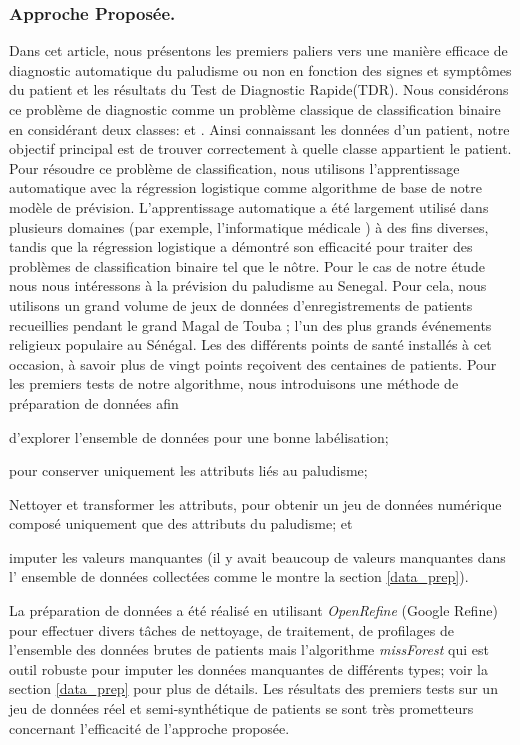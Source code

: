 \subsubsection{Approche Proposée.}
Dans cet article, nous présentons les premiers paliers vers une manière efficace de diagnostic automatique du paludisme ou non en fonction des signes et symptômes du patient et les résultats du Test de Diagnostic Rapide(TDR). Nous considérons ce problème de diagnostic comme un problème classique de classification binaire en considérant deux classes:  et
. Ainsi connaissant les données d'un patient, notre objectif principal est de trouver correctement à quelle classe appartient le patient. Pour résoudre ce problème de classification, nous utilisons l’apprentissage automatique avec la  régression logistique comme algorithme de base de notre modèle  de prévision. L'apprentissage automatique a été largement utilisé dans plusieurs domaines (par exemple, l'informatique médicale \cite{Du13}) à des fins diverses, tandis que la régression logistique a démontré son efficacité pour traiter des problèmes de classification binaire tel que le nôtre. Pour le cas de notre étude nous nous intéressons à la prévision du paludisme au Senegal. Pour cela, nous utilisons un grand volume de jeux de données d’enregistrements de patients recueillies pendant le grand Magal de Touba ; l’un des plus grands événements religieux populaire au Sénégal.  Les des différents points de santé installés à cet occasion, à savoir plus de vingt points  reçoivent des centaines de patients. Pour les premiers tests de notre algorithme, nous introduisons une méthode  de préparation de données afin 
\begin{inparaenum}[(i)]
\item d’explorer l'ensemble de données pour une bonne labélisation; 
\item  pour  conserver uniquement les attributs liés au paludisme;
\item  Nettoyer  et transformer les attributs, pour obtenir un jeu de données  numérique composé uniquement que des attributs du paludisme; et 
\item imputer les valeurs manquantes (il y avait beaucoup de valeurs manquantes dans l’ ensemble de données collectées comme le montre la section \ref{data_prep}). 
\end{inparaenum}
La préparation de données a été réalisé en utilisant \emph{OpenRefine} (Google Refine) pour effectuer divers tâches de nettoyage, de traitement, de profilages de l’ensemble des données brutes de patients mais l’algorithme  \emph{missForest} qui est outil robuste pour imputer les données manquantes de différents types; voir la section \ref{data_prep}  pour plus de détails. Les résultats des premiers tests sur un jeu de données  réel et semi-synthétique de patients se sont très prometteurs concernant l’efficacité de l’approche proposée.

